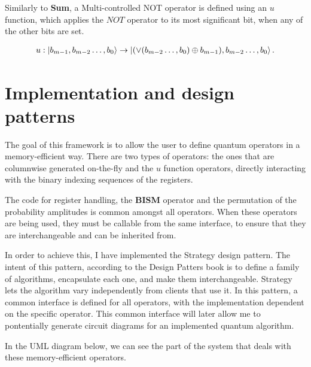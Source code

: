 Similarly to \textbf{Sum}, a Multi-controlled NOT operator is defined using an $u$ function, which applies the $NOT$ operator to its most significant bit, when any of the other bits are set.

\begin{align*}
    u: \ket{b_{m-1},b_{m-2}\dots{},b_0} \rightarrow \ket{(\vee(b_{m-2}\dots{},b_0) \oplus{} b_{m-1}),b_{m-2}\dots{},b_0}.
\end{align*}

\section{Implementation and design patterns}

The goal of this framework is to allow the user to define quantum operators in a memory-efficient way. There are two types of operators: the ones that are columnwise generated on-the-fly and the $u$ function operators, directly interacting with the binary indexing sequences of the registers.

The code for register handling, the \textbf{BISM} operator and the permutation of the probability amplitudes is common amongst all operators. When these operators are being used, they must be callable from the same interface, to ensure that they are interchangeable and can be inherited from.

In order to achieve this, I have implemented the Strategy design pattern. The intent of this pattern, according to the Design Patters\cite{DesignPatterns} book is to define a family of algorithms, encapsulate each one, and make them interchangeable. Strategy lets the algorithm vary independently from clients that use it. In this pattern, a common interface is defined for all operators, with the implementation dependent on the specific operator. This common interface will later allow me to pontentially generate circuit diagrams for an implemented quantum algorithm.

In the UML diagram below, we can see the part of the system that deals with these memory-efficient operators.

